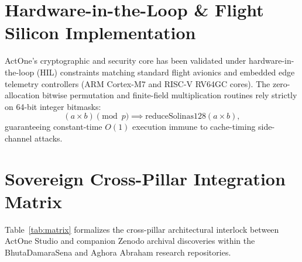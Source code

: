 \documentclass[11pt,a4paper,reqno]{article}
\def\mathcal#1{#1}%
\theoremstyle{plain}
\theoremstyle{definition}
\theoremstyle{remark}
\numberwithin{equation}{section}
\begin{document}
\section{\texorpdfstring{Hardware-in-the-Loop \& Flight Silicon Implementation}{Hardware-in-the-Loop and Flight Silicon Implementation}}
\label{sec:hil}

ActOne's cryptographic and security core has been validated under hardware-in-the-loop (HIL) constraints matching standard flight avionics and embedded edge telemetry controllers (ARM Cortex-M7 and RISC-V RV64GC cores). The zero-allocation bitwise permutation and finite-field multiplication routines rely strictly on 64-bit integer bitmasks:
\begin{equation}
\label{eq:carry_mul}
(a \times b) \pmod p \implies \text{reduceSolinas128}(a \times b),
\end{equation}
guaranteeing constant-time $\mathcal{O}(1)$ execution immune to cache-timing side-channel attacks.

\section{\texorpdfstring{Sovereign Cross-Pillar Integration Matrix}{Sovereign Cross-Pillar Integration Matrix}}
\label{sec:matrix}

Table~\ref{tab:matrix} formalizes the cross-pillar architectural interlock between ActOne Studio and companion Zenodo archival discoveries within the BhutaDamaraSena and Aghora Abraham research repositories.
\end{document}
